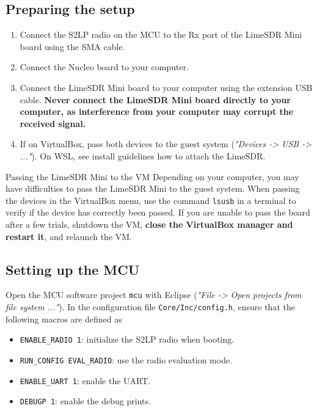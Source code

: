 \subsection{Preparing the setup}

\begin{enumerate}
    \item Connect the S2LP radio on the MCU to the Rx port of the LimeSDR Mini board using the SMA cable.
    \item Connect the Nucleo board to your computer.
    \item Connect the LimeSDR Mini board to your computer using the extension USB cable.
    \textbf{Never connect the LimeSDR Mini board directly to your computer, as interference from your computer may corrupt the received signal.}
    \item If on VirtualBox, pass both devices to the guest system (\textit{"Devices -> USB -> ..."}). On WSL, see install guidelines how to attach the LimeSDR.
\end{enumerate}

\begin{bclogo}[couleur = gray!20, arrondi = 0.2, logo=\bcinfo]{Passing the LimeSDR Mini to the VM}
    Depending on your computer, you may have difficulties to pass the LimeSDR Mini to the guest system.
    When passing the devices in the VirtualBox menu, use the command \texttt{lsusb} in a terminal to verify if the device has correctly been passed.
    If you are unable to pass the board after a few trials, shutdown the VM, \textbf{close the VirtualBox manager and restart it}, and relaunch the VM.
\end{bclogo}

\subsection{Setting up the MCU}

Open the MCU software project \texttt{mcu} with Eclipse (\textit{"File -> Open projects from file system ..."}).
In the configuration file \texttt{Core/Inc/config.h}, ensure that the following macros are defined as
\begin{itemize}
    \item \texttt{ENABLE\_RADIO 1}: initialize the S2LP radio when booting.
    \item \texttt{RUN\_CONFIG EVAL\_RADIO}: use the radio evaluation mode.
    \item \texttt{ENABLE\_UART 1}: enable the UART.
    \item \texttt{DEBUGP 1}: enable the debug prints.
\end{itemize}

